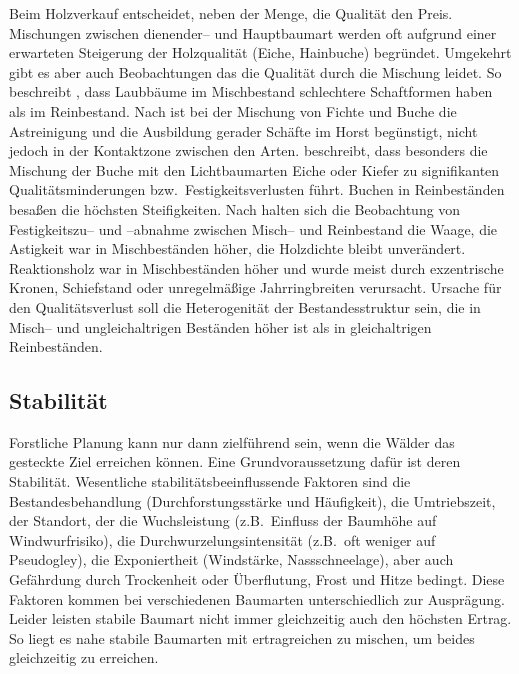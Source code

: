 \documentclass[twocolumn]{scrartcl}
\begin{document}
Beim Holzverkauf entscheidet, neben der Menge, die Qualität den
Preis. Mischungen zwischen dienender-- und Hauptbaumart werden oft
aufgrund einer erwarteten Steigerung der Holzqualität (Eiche,
Hainbuche) begründet. Umgekehrt gibt es aber auch Beobachtungen das
die Qualität durch die Mischung leidet. So beschreibt
\cite{burger1925plenterwald}, dass Laubbäume im Mischbestand
schlechtere Schaftformen haben als im Reinbestand. Nach
\cite{tiebel2016qualitaet} ist bei der Mischung von Fichte und Buche
die Astreinigung und die Ausbildung gerader Schäfte im Horst
begünstigt, nicht jedoch in der Kontaktzone zwischen den
Arten. \cite{rais2019MischungQualitaet} beschreibt, dass besonders die
Mischung der Buche mit den Lichtbaumarten Eiche oder Kiefer zu
signifikanten Qualitätsminderungen bzw.\ Festigkeitsverlusten
führt. Buchen in Reinbeständen besaßen die höchsten
Steifigkeiten. Nach \cite{pretzsch2016holzqualitaetMischRein} halten
sich die Beobachtung von Festigkeitszu-- und --abnahme zwischen
Misch-- und Reinbestand die Waage, die Astigkeit war in Mischbeständen
höher, die Holzdichte bleibt unverändert. Reaktionsholz war in
Mischbeständen höher und wurde meist durch exzentrische Kronen,
Schiefstand oder unregelmäßige Jahrringbreiten verursacht. Ursache für
den Qualitätsverlust soll die Heterogenität der Bestandesstruktur
sein, die in Misch-- und ungleichaltrigen Beständen höher ist als in
gleichaltrigen Reinbeständen.

\subsection{Stabilität}
\label{ssec:stabilitaet}

Forstliche Planung kann nur dann zielführend sein, wenn die Wälder das gesteckte
Ziel erreichen können. Eine Grundvoraussetzung dafür ist deren Stabilität.
Wesentliche stabilitätsbeeinflussende Faktoren sind die Bestandesbehandlung
(Durchforstungsstärke und Häufigkeit), die Umtriebszeit, der Standort, der die
Wuchsleistung (z.B.\ Einfluss der Baumhöhe auf Windwurfrisiko), die
Durchwurzelungsintensität (z.B.\ oft weniger auf Pseudogley), die Exponiertheit
(Windstärke, Nassschneelage), aber auch Gefährdung durch Trockenheit oder
Überflutung, Frost und Hitze bedingt. Diese Faktoren kommen bei verschiedenen
Baumarten unterschiedlich zur Ausprägung. Leider leisten stabile Baumart nicht
immer gleichzeitig auch den höchsten Ertrag. So liegt es nahe stabile Baumarten
mit ertragreichen zu mischen, um beides gleichzeitig zu erreichen.
\end{document}

